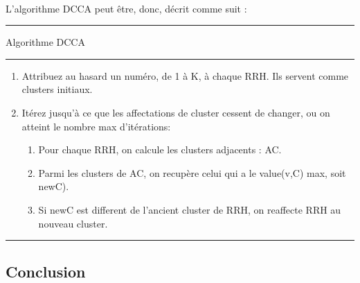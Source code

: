 \documentclass{report}
\begin{document}
\paragraph{}
L'algorithme DCCA peut être, donc, décrit comme suit :\\
\rule{\linewidth}{.1pt} 
\Large{Algorithme} DCCA\\
\rule{\linewidth}{.1pt} 
\begin{enumerate}
\item Attribuez au hasard un numéro, de 1 à K, à chaque RRH.
Ils servent comme clusters initiaux.
\item Itérez jusqu'à ce que les affectations de cluster cessent de changer, ou on atteint le nombre max d'itérations: 
\begin{enumerate}
\item Pour chaque RRH, on calcule les clusters adjacents : AC.
\item Parmi les clusters de AC, on recupère celui qui a le value(v,C) max, soit newC).
\item Si newC est different de l'ancient cluster de RRH, on reaffecte RRH au nouveau cluster.
\end{enumerate}
\end{enumerate}
\rule{\linewidth}{.1pt} 



\begin{center}
\section*{\LARGE{Conclusion}}
   \end{center}
 \Large{\paragraph{}

 }
\end{document}
